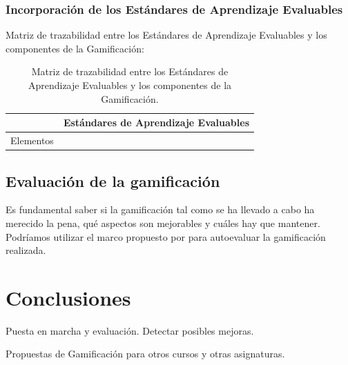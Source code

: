 \documentclass[a4paper, 12pt]{book}
\begin{document}
\subsection{Incorporación de los Estándares de Aprendizaje Evaluables}

Matriz de trazabilidad entre los Estándares de Aprendizaje Evaluables y los componentes de la Gamificación:
\begin{table}[hbtp]
\caption{Matriz de trazabilidad entre los Estándares de Aprendizaje Evaluables y los componentes de la Gamificación.}
\label{Trazabilidad}
\begin{tabular}{c|c}
& Estándares de Aprendizaje Evaluables\\\hline
Elementos & \\\hline
\end{tabular}
\end{table}


\section{Evaluación de la gamificación}

Es fundamental saber si la gamificación tal como se ha llevado a cabo ha merecido la pena, qué aspectos son mejorables y cuáles hay que mantener.
%
Podríamos utilizar el marco propuesto por \cite{EvaluacionGamificacion} para autoevaluar la gamificación realizada.



\cleardoublepage
\chapter{Conclusiones}
\label{chap:conclusiones}



\label{sec:trabajos_futuros}

Puesta en marcha y evaluación. Detectar posibles mejoras.

Propuestas de Gamificación para otros cursos y otras asignaturas.
\end{document}
